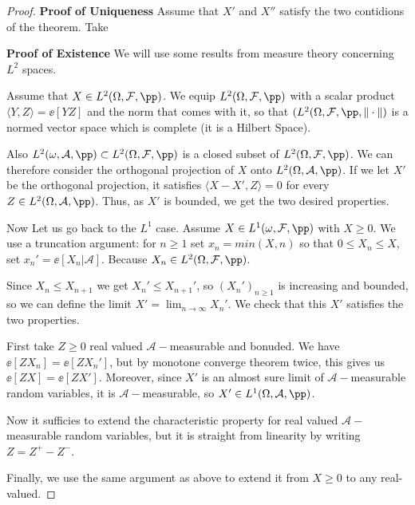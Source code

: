 \documentclass[../main.tex]{subfiles}
\begin{document}
    \begin{proof}
      \hfill

      \noindent
      \textbf{\sffamily Proof of Uniqueness} Assume that $X'$ and $X''$ satisfy the two
      contidions of the theorem. Take 

      \vspace{1em}
      \noindent
      \textbf{\sffamily Proof of Existence} We will use some results from measure
      theory concerning $L^2$ spaces.

      \vspace{0.4em}

      Assume that $X \in L^2(\Omega, \mathcal{F}, \pp)$. We equip $L^2(\Omega,
      \mathcal{F}, \pp)$ with a scalar product $\langle Y,Z \rangle = \ee[YZ]$
      and the norm that comes with it, so that $(L^2(\Omega, \mathcal{F}, \pp,
      \|\cdot\|)$ is a normed vector space which is complete (it is a Hilbert
      Space).

      Also $L^2(\omega, \mathcal{A}, \pp) \subset L^2(\Omega, \mathcal{F},
      \pp)$ is a closed subset of $L^2(\Omega, \mathcal{F}, \pp)$. We can
      therefore consider the orthogonal projection of $X$ onto
      $L^2(\Omega,\mathcal{A}, \pp)$. If we let $X'$ be the orthogonal projection, 
      it satisfies $\langle X - X' ,Z \rangle = 0$ for every $Z \in
      L^2(\Omega, \mathcal{A}, \pp)$. Thus, as $X'$ is bounded, we get the two
      desired properties.

      \vspace{0.5em}

      Now Let us go back to the $L^1$ case. Assume $X \in L^1(\omega,
      \mathcal{F}, \pp)$ with $X \geq 0$. We use a truncation argument: for $n
      \geq 1$ set $x_n = min(X, n)$ so that $0 \leq X_n \leq X$, set 
      $x_{n}' = \ee[X_n  |\mathcal{A}]$. Because $X_n \in L^2(\Omega,
      \mathcal{F}, \pp)$.

      Since $X_n \leq X_{n+1}$ we get $X_n' \leq X_{n+1}'$, so $(X_n')_{n \geq
      1}$ is increasing and bounded, so we can define the limit $X' = \lim_{n
      \to \infty} X_n'$. We check that this $X'$ satisfies the two properties.

      First take $Z \geq 0$ real valued $\mathcal{A}-$measurable and bonuded.
      We have $\ee[ZX_n] = \ee[ZX_n']$, but by monotone converge theorem
      twice, this gives us $\ee[ZX] = \ee[ZX']$. Moreover, since $X'$ is an
      almost sure limit of $\mathcal{A}-$measurable random variables, it is
      $\mathcal{A}-$measurable, so $X' \in L^1(\Omega, \mathcal{A}, \pp)$.

      Now it sufficies to extend the characteristic property for real valued
      $\mathcal{A}-$measurable random variables, but it is straight from
      linearity by writing $Z = Z^+ - Z^-$.
      
      Finally, we use the same argument as above to extend it from $X \geq 0$
      to any real-valued.
    \end{proof}
\end{document}
